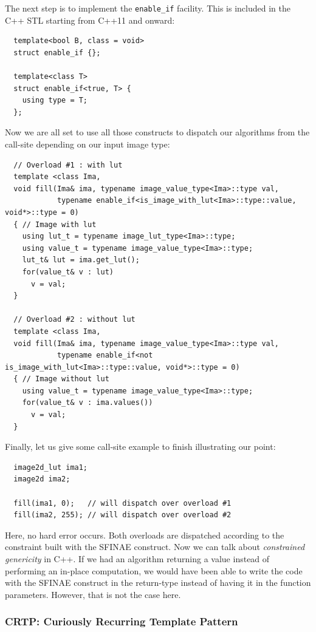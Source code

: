 The next step is to implement the \texttt{enable\_if} facility. This is included in the C++ STL starting from C++11 and
onward:

\begin{verbatim}
  template<bool B, class = void>
  struct enable_if {};

  template<class T>
  struct enable_if<true, T> {
    using type = T;
  };
\end{verbatim}

Now we are all set to use all those constructs to dispatch our algorithms from the call-site depending on our input
image type:

\begin{verbatim}
  // Overload #1 : with lut
  template <class Ima,
  void fill(Ima& ima, typename image_value_type<Ima>::type val,
            typename enable_if<is_image_with_lut<Ima>::type::value, void*>::type = 0)
  { // Image with lut
    using lut_t = typename image_lut_type<Ima>::type;
    using value_t = typename image_value_type<Ima>::type;
    lut_t& lut = ima.get_lut();
    for(value_t& v : lut)
      v = val;
  }

  // Overload #2 : without lut
  template <class Ima,
  void fill(Ima& ima, typename image_value_type<Ima>::type val,
            typename enable_if<not is_image_with_lut<Ima>::type::value, void*>::type = 0)
  { // Image without lut
    using value_t = typename image_value_type<Ima>::type;
    for(value_t& v : ima.values())
      v = val;
  }
\end{verbatim}

Finally, let us give some call-site example to finish illustrating our point:

\begin{verbatim}
  image2d_lut ima1;
  image2d ima2;

  fill(ima1, 0);   // will dispatch over overload #1
  fill(ima2, 255); // will dispatch over overload #2
\end{verbatim}
Here, no hard error occurs. Both overloads are dispatched according to the constraint built with the SFINAE construct.
Now we can talk about \emph{constrained genericity} in C++. If we had an algorithm returning a value instead of
performing an in-place computation, we would have been able to write the code with the SFINAE construct in the
return-type instead of having it in the function parameters. However, that is not the case here.


\subsubsection{CRTP: Curiously Recurring Template Pattern}
\label{subsec:crtp}

